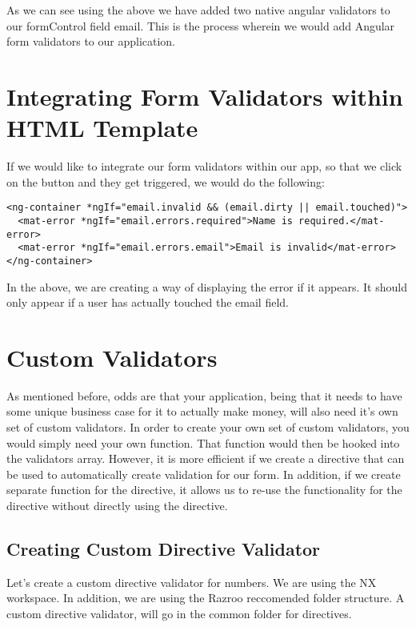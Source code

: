 As we can see using the above we have added two native angular validators to
our formControl field email. This is the process wherein we would add Angular 
form validators to our application. 

\section{Integrating Form Validators within HTML Template}
If we would like to integrate our form validators within our app, so that we 
click on the button and they get triggered, we would do the following: 

\begin{lstlisting}[caption=Integrate Form Validation with HTML]
<ng-container *ngIf="email.invalid && (email.dirty || email.touched)">
  <mat-error *ngIf="email.errors.required">Name is required.</mat-error>
  <mat-error *ngIf="email.errors.email">Email is invalid</mat-error>
</ng-container>
\end{lstlisting}

In the above, we are creating a way of displaying the error if it appears. It 
should only appear if a user has actually touched the email field. 

\section{Custom Validators}
As mentioned before, odds are that your application, being that it needs to 
have some unique business case for it to actually make money, will also need 
it's own set of custom validators. In order to create your own set of custom 
validators, you would simply need your own function. That function would then 
be hooked into the validators array. However, it is more efficient if we create
a directive that can be used to automatically create validation for our form. 
In addition, if we create separate function for the directive, it allows us
to re-use the functionality for the directive without directly using the
directive.

\subsection{Creating Custom Directive Validator}
Let's create a custom directive validator for numbers. We are using the NX 
workspace. In addition, we are using the Razroo reccomended folder structure. 
A custom directive validator, will go in the common folder for directives. 


